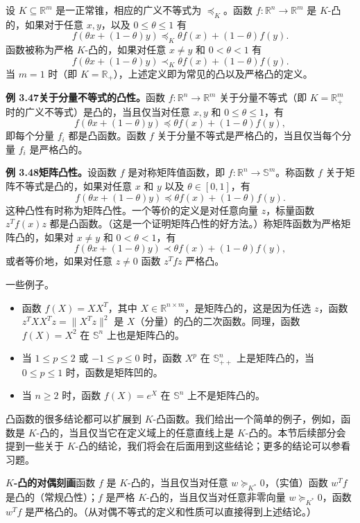 \documentclass[UTF8,12pt,a4paper,fontset=fandol]{ctexart}
\begin{document}
设 $K\subseteq\mathbb{R}^m$ 是一正常锥，相应的广义不等式为 $\preceq_K$。函数 $f:\mathbb{R}^n\to\mathbb{R}^m$ 是 $K$-凸的，如果对于任意 $x,y$，以及 $0\leq\theta\leq1$ 有
\[
f(\theta x+(1-\theta)y)\preceq_K \theta f(x)+(1-\theta)f(y).
\]
函数被称为严格 $K$-凸的，如果对任意 $x\neq y$ 和 $0<\theta<1$ 有
\[
f(\theta x+(1-\theta)y)\prec_K \theta f(x)+(1-\theta)f(y).
\]
当 $m=1$ 时（即 $K=\mathbb{R}_+$），上述定义即为常见的凸以及严格凸的定义。

\noindent\textbf{例 3.47\quad 关于分量不等式的凸性。}\quad 函数 $f:\mathbb{R}^n\to\mathbb{R}^m$ 关于分量不等式（即 $K=\mathbb{R}_+^m$ 时的广义不等式）是凸的，当且仅当对任意 $x,y$ 和 $0\leq\theta\leq1$，有
\[
f(\theta x+(1-\theta)y)\preceq \theta f(x)+(1-\theta)f(y),
\]
即每个分量 $f_i$ 都是凸函数。函数 $f$ 关于分量不等式是严格凸的，当且仅当每个分量 $f_i$ 是严格凸的。

\noindent\textbf{例 3.48\quad 矩阵凸性。}\quad 设函数 $f$ 是对称矩阵值函数，即 $f:\mathbb{R}^n\to\mathbb{S}^m$。称函数 $f$ 关于矩阵不等式是凸的，如果对任意 $x$ 和 $y$ 以及 $\theta\in[0,1]$，有
\[
f(\theta x+(1-\theta)y)\preceq \theta f(x)+(1-\theta)f(y).
\]
这种凸性有时称为矩阵凸性。一个等价的定义是对任意向量 $z$，标量函数 $z^Tf(x)z$ 都是凸函数。（这是一个证明矩阵凸性的好方法。）称矩阵函数为严格矩阵凸的，如果对 $x\neq y$ 和 $0<\theta<1$，有
\[
f(\theta x+(1-\theta)y)\prec \theta f(x)+(1-\theta)f(y),
\]
或者等价地，如果对任意 $z\neq0$ 函数 $z^Tfz$ 严格凸。

一些例子。
\begin{itemize}
\item 函数 $f(X)=XX^T$，其中 $X\in\mathbb{R}^{n\times m}$，是矩阵凸的，这是因为任选 $z$，函数 $z^TXX^Tz=\|X^Tz\|^2$ 是 $X$（分量）的凸的二次函数。同理，函数 $f(X)=X^2$ 在 $\mathbb{S}^n$ 上也是矩阵凸的。
\item 当 $1\leq p\leq2$ 或 $-1\leq p\leq0$ 时，函数 $X^p$ 在 $\mathbb{S}_{++}^n$ 上是矩阵凸的，当 $0\leq p\leq1$ 时，函数是矩阵凹的。
\item 当 $n\geq2$ 时，函数 $f(X)=e^X$ 在 $\mathbb{S}^n$ 上不是矩阵凸的。
\end{itemize}

凸函数的很多结论都可以扩展到 $K$-凸函数。我们给出一个简单的例子，例如，函数是 $K$-凸的，当且仅当它在定义域上的任意直线上是 $K$-凸的。本节后续部分会提到一些关于 $K$-凸的结论，我们将会在后面用到这些结论；更多的结论可以参看习题。

\noindent\textbf{$K$-凸的对偶刻画}\quad 函数 $f$ 是 $K$-凸的，当且仅当对任意 $w\succeq_{K^*}0$，（实值）函数 $w^Tf$ 是凸的（常规凸性）；$f$ 是严格 $K$-凸的，当且仅当对任意非零向量 $w\succeq_{K^*}0$，函数 $w^Tf$ 是严格凸的。（从对偶不等式的定义和性质可以直接得到上述结论。）
\end{document}
